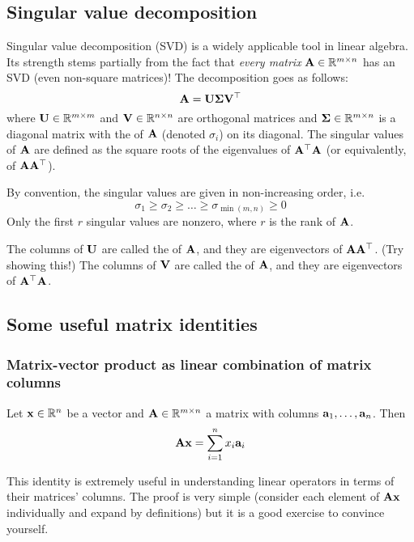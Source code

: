 \subsection{Singular value decomposition}
Singular value decomposition (SVD) is a widely applicable tool in linear algebra.
Its strength stems partially from the fact that \textit{every matrix} $\mathbf{A} \in \mathbb{R}^{m \times n}$ has an SVD (even non-square matrices)!
The decomposition goes as follows:
\[\mathbf{A} = \mathbf{U}\mathbf{\Sigma}\mathbf{V}^\top\]
where $\mathbf{U} \in \mathbb{R}^{m \times m}$ and $\mathbf{V} \in \mathbb{R}^{n \times n}$ are orthogonal matrices and $\mathbf{\Sigma} \in \mathbb{R}^{m \times n}$ is a diagonal matrix with the  of $\mathbf{A}$ (denoted $\sigma_i$) on its diagonal.
The singular values of $\mathbf{A}$ are defined as the square roots of the eigenvalues of $\mathbf{A}^\top\mathbf{A}$ (or equivalently, of $\mathbf{A}\mathbf{A}^\top$).

By convention, the singular values are given in non-increasing order, i.e.
\[\sigma_1 \geq \sigma_2 \geq \dots \geq \sigma_{\min(m,n)} \geq 0\]
Only the first $r$ singular values are nonzero, where $r$ is the rank of $\mathbf{A}$.

The columns of $\mathbf{U}$ are called the  of $\mathbf{A}$, and they are eigenvectors of $\mathbf{A}\mathbf{A}^\top$.
(Try showing this!)
The columns of $\mathbf{V}$ are called the  of $\mathbf{A}$, and they are eigenvectors of $\mathbf{A}^\top\mathbf{A}$.

\subsection{Some useful matrix identities}
\subsubsection{Matrix-vector product as linear combination of matrix columns}
\begin{proposition}
Let $\mathbf{x} \in \mathbb{R}^n$ be a vector and $\mathbf{A} \in \mathbb{R}^{m \times n}$ a matrix with columns $\mathbf{a}_1, \dots, \mathbf{a}_n$.
Then
\[\mathbf{A}\mathbf{x} = \sum_{i=1}^n x_i\mathbf{a}_i\]
\end{proposition}
This identity is extremely useful in understanding linear operators in terms of their matrices' columns.
The proof is very simple (consider each element of $\mathbf{A}\mathbf{x}$ individually and expand by definitions) but it is a good exercise to convince yourself.

